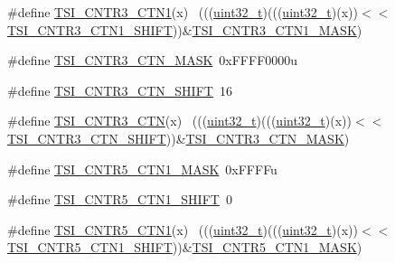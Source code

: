 \begin{DoxyCompactItemize}
\item 
\#define \hyperlink{group___t_s_i___register___masks_ga1e6f0a4e5556aaf6a47e0c4b09abcdf8}{T\+S\+I\+\_\+\+C\+N\+T\+R3\+\_\+\+C\+T\+N1}(x)                                            ~(((\hyperlink{_p_e___types_8h_a33594304e786b158f3fb30289278f5af}{uint32\+\_\+t})(((\hyperlink{_p_e___types_8h_a33594304e786b158f3fb30289278f5af}{uint32\+\_\+t})(x))$<$$<$\hyperlink{group___t_s_i___register___masks_ga40857a8de39e7f24268f2209546b7d92}{T\+S\+I\+\_\+\+C\+N\+T\+R3\+\_\+\+C\+T\+N1\+\_\+\+S\+H\+I\+FT}))\&\hyperlink{group___t_s_i___register___masks_ga944c52b8a9c3019342c1c27eb7ab5d1f}{T\+S\+I\+\_\+\+C\+N\+T\+R3\+\_\+\+C\+T\+N1\+\_\+\+M\+A\+SK})
\item 
\#define \hyperlink{group___t_s_i___register___masks_ga706c452af2d87895eec6b24787418763}{T\+S\+I\+\_\+\+C\+N\+T\+R3\+\_\+\+C\+T\+N\+\_\+\+M\+A\+SK}~0x\+F\+F\+F\+F0000u
\item 
\#define \hyperlink{group___t_s_i___register___masks_ga7b5cdf80f7cb214a07cc1a08f84dafde}{T\+S\+I\+\_\+\+C\+N\+T\+R3\+\_\+\+C\+T\+N\+\_\+\+S\+H\+I\+FT}~16
\item 
\#define \hyperlink{group___t_s_i___register___masks_ga820fd10f31f0e10f48840243bbc1fe68}{T\+S\+I\+\_\+\+C\+N\+T\+R3\+\_\+\+C\+TN}(x)                                              ~(((\hyperlink{_p_e___types_8h_a33594304e786b158f3fb30289278f5af}{uint32\+\_\+t})(((\hyperlink{_p_e___types_8h_a33594304e786b158f3fb30289278f5af}{uint32\+\_\+t})(x))$<$$<$\hyperlink{group___t_s_i___register___masks_ga7b5cdf80f7cb214a07cc1a08f84dafde}{T\+S\+I\+\_\+\+C\+N\+T\+R3\+\_\+\+C\+T\+N\+\_\+\+S\+H\+I\+FT}))\&\hyperlink{group___t_s_i___register___masks_ga706c452af2d87895eec6b24787418763}{T\+S\+I\+\_\+\+C\+N\+T\+R3\+\_\+\+C\+T\+N\+\_\+\+M\+A\+SK})
\item 
\#define \hyperlink{group___t_s_i___register___masks_ga7c016e770c1a5682417e7f7df4887663}{T\+S\+I\+\_\+\+C\+N\+T\+R5\+\_\+\+C\+T\+N1\+\_\+\+M\+A\+SK}~0x\+F\+F\+F\+Fu
\item 
\#define \hyperlink{group___t_s_i___register___masks_ga1aa3ace6f56df71e799b8c737559e2ab}{T\+S\+I\+\_\+\+C\+N\+T\+R5\+\_\+\+C\+T\+N1\+\_\+\+S\+H\+I\+FT}~0
\item 
\#define \hyperlink{group___t_s_i___register___masks_ga80141145e6a5e1ff736afd93146f5af2}{T\+S\+I\+\_\+\+C\+N\+T\+R5\+\_\+\+C\+T\+N1}(x)                                            ~(((\hyperlink{_p_e___types_8h_a33594304e786b158f3fb30289278f5af}{uint32\+\_\+t})(((\hyperlink{_p_e___types_8h_a33594304e786b158f3fb30289278f5af}{uint32\+\_\+t})(x))$<$$<$\hyperlink{group___t_s_i___register___masks_ga1aa3ace6f56df71e799b8c737559e2ab}{T\+S\+I\+\_\+\+C\+N\+T\+R5\+\_\+\+C\+T\+N1\+\_\+\+S\+H\+I\+FT}))\&\hyperlink{group___t_s_i___register___masks_ga7c016e770c1a5682417e7f7df4887663}{T\+S\+I\+\_\+\+C\+N\+T\+R5\+\_\+\+C\+T\+N1\+\_\+\+M\+A\+SK})
$$
\end{DoxyCompactItemize}

